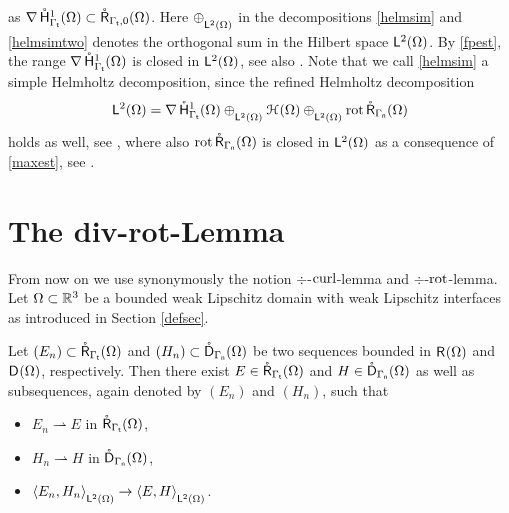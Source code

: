 \documentclass[a4paper]{amsart}
\newcommand{\wto}{\rightharpoonup}
\begin{document}
as $\na\hocgatom\subset\rcgatzom$. 
Here $\oplus_{\ltom}$ in the decompositions \eqref{helmsim} and \eqref{helmsimtwo}
denotes the orthogonal sum in the Hilbert space $\ltom$.
By \eqref{fpest}, the range $\na\hocgatom$ is closed in $\ltom$,
see also \cite[Lemma 5.2]{bauerpaulyschomburgmcpweaklip}.
Note that we call \eqref{helmsim} a simple Helmholtz decomposition, 
since the refined Helmholtz decomposition
$$\ltom=\na\hocgatom\oplus_{\ltom}\harmom\oplus_{\ltom}\rot\rcganom$$
holds as well, 
see \cite[Theorem 5.3]{bauerpaulyschomburgmcpweaklip},
where also $\rot\rcganom$ is closed in $\ltom$
as a consequence of \eqref{maxest}, 
see \cite[Lemma 5.2]{bauerpaulyschomburgmcpweaklip}.

\section{The div-rot-Lemma}

From now on we use synonymously
the notion $\div$-$\curl$-lemma and $\div$-$\rot$-lemma.
Let $\om\subset\rt$ be a bounded weak Lipschitz domain with weak Lipschitz interfaces
as introduced in Section \ref{defsec}.

\begin{theo}
Let $(E_{n})\subset\rcgatom$ and $(H_{n})\subset\dcganom$ be two sequences bounded in $\rom$ and $\dom$, respectively.
Then there exist $E\in\rcgatom$ and $H\in\dcganom$ as well as subsequences, again denoted by $(E_{n})$ and $(H_{n})$, 
such that
\begin{itemize}
\item
$E_{n}\wto E$ in $\rcgatom$,
\item
$H_{n}\wto H$ in $\dcganom$,
\item
$\scpltom{E_{n}}{H_{n}}\to\scpltom{E}{H}$.
\end{itemize}
\end{theo}
\end{document}
